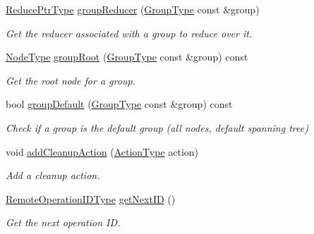 \begin{DoxyCompactItemize}
\item 
\hyperlink{structvt_1_1group_1_1_group_manager_a0c646983506b624ad93ceb127df9e811}{Reduce\+Ptr\+Type} \hyperlink{structvt_1_1group_1_1_group_manager_ab6ee94facc8da1e80e52cf0eda26dc5e}{group\+Reducer} (\hyperlink{namespacevt_a27b5e4411c9b6140c49100e050e2f743}{Group\+Type} const \&group)
\begin{DoxyCompactList}\small\item\em Get the reducer associated with a group to reduce over it. \end{DoxyCompactList}\item 
\hyperlink{namespacevt_a866da9d0efc19c0a1ce79e9e492f47e2}{Node\+Type} \hyperlink{structvt_1_1group_1_1_group_manager_ae813f2b894016f05569d7d06aae55315}{group\+Root} (\hyperlink{namespacevt_a27b5e4411c9b6140c49100e050e2f743}{Group\+Type} const \&group) const
\begin{DoxyCompactList}\small\item\em Get the root node for a group. \end{DoxyCompactList}\item 
bool \hyperlink{structvt_1_1group_1_1_group_manager_ad9ae779b8223ad458edd62ae5e8a9003}{group\+Default} (\hyperlink{namespacevt_a27b5e4411c9b6140c49100e050e2f743}{Group\+Type} const \&group) const
\begin{DoxyCompactList}\small\item\em Check if a group is the default group (all nodes, default spanning tree) \end{DoxyCompactList}\item 
void \hyperlink{structvt_1_1group_1_1_group_manager_a79edddb814a77d2ff45fea14291e95df}{add\+Cleanup\+Action} (\hyperlink{namespacevt_ae0a5a7b18cc99d7b732cb4d44f46b0f3}{Action\+Type} action)
\begin{DoxyCompactList}\small\item\em Add a cleanup action. \end{DoxyCompactList}\item 
\hyperlink{namespacevt_1_1group_a73f2624ddeb535b39a08b6524f26b244}{Remote\+Operation\+I\+D\+Type} \hyperlink{structvt_1_1group_1_1_group_manager_ac8a02606998928c4d688386cddf0d3e0}{get\+Next\+ID} ()
\begin{DoxyCompactList}\small\item\em Get the next operation ID. \end{DoxyCompactList}\end{DoxyCompactItemize}
